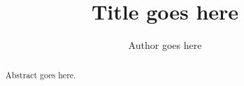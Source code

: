 \documentclass[draft]{article}
\title{Title goes here}
\author{Author goes here}
\begin{document}
\maketitle

\begin{abstract}
Abstract goes here.
\end{abstract}
\end{document}
